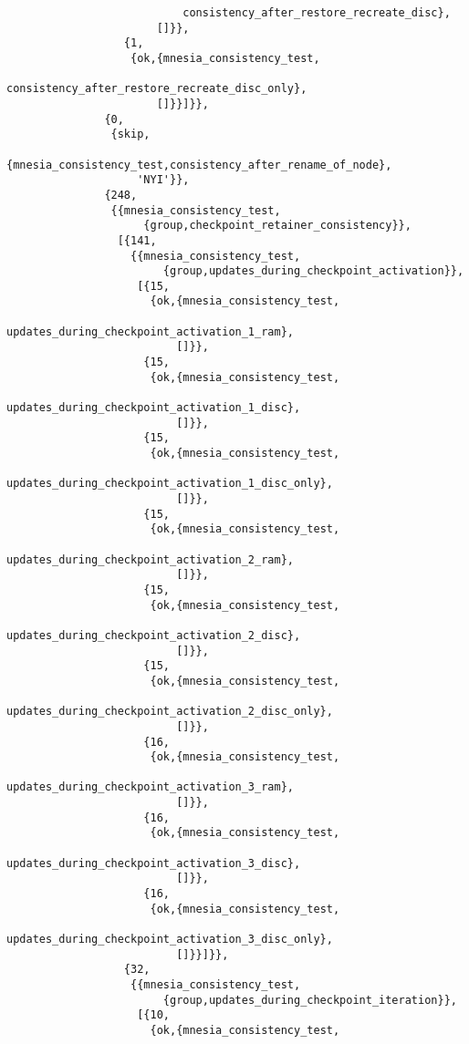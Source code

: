 \begin{verbatim}
                           consistency_after_restore_recreate_disc},
                       []}},
                  {1,
                   {ok,{mnesia_consistency_test,
                           consistency_after_restore_recreate_disc_only},
                       []}}]}},
               {0,
                {skip,
                    {mnesia_consistency_test,consistency_after_rename_of_node},
                    'NYI'}},
               {248,
                {{mnesia_consistency_test,
                     {group,checkpoint_retainer_consistency}},
                 [{141,
                   {{mnesia_consistency_test,
                        {group,updates_during_checkpoint_activation}},
                    [{15,
                      {ok,{mnesia_consistency_test,
                              updates_during_checkpoint_activation_1_ram},
                          []}},
                     {15,
                      {ok,{mnesia_consistency_test,
                              updates_during_checkpoint_activation_1_disc},
                          []}},
                     {15,
                      {ok,{mnesia_consistency_test,
                              updates_during_checkpoint_activation_1_disc_only},
                          []}},
                     {15,
                      {ok,{mnesia_consistency_test,
                              updates_during_checkpoint_activation_2_ram},
                          []}},
                     {15,
                      {ok,{mnesia_consistency_test,
                              updates_during_checkpoint_activation_2_disc},
                          []}},
                     {15,
                      {ok,{mnesia_consistency_test,
                              updates_during_checkpoint_activation_2_disc_only},
                          []}},
                     {16,
                      {ok,{mnesia_consistency_test,
                              updates_during_checkpoint_activation_3_ram},
                          []}},
                     {16,
                      {ok,{mnesia_consistency_test,
                              updates_during_checkpoint_activation_3_disc},
                          []}},
                     {16,
                      {ok,{mnesia_consistency_test,
                              updates_during_checkpoint_activation_3_disc_only},
                          []}}]}},
                  {32,
                   {{mnesia_consistency_test,
                        {group,updates_during_checkpoint_iteration}},
                    [{10,
                      {ok,{mnesia_consistency_test,

\end{verbatim}
